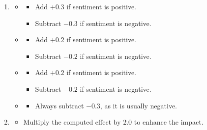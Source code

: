 \documentclass[3p,times,procedia]{elsarticle}
\begin{document}
\begin{enumerate}
    \item {}
    \begin{itemize}
        \item {} 
        \begin{itemize}
            \item Add $+0.3$ if sentiment is positive.
            \item Subtract $-0.3$ if sentiment is negative.
        \end{itemize}
        \item {}
        \begin{itemize}
            \item Add $+0.2$ if sentiment is positive.
            \item Subtract $-0.2$ if sentiment is negative.
        \end{itemize}
        \item {}
        \begin{itemize}
            \item Add $+0.2$ if sentiment is positive.
            \item Subtract $-0.2$ if sentiment is negative.
        \end{itemize}
        \item {}
        \begin{itemize}
            \item Always subtract $-0.3$, as it is usually negative.
        \end{itemize}
    \end{itemize}

    \item {}
    \begin{itemize}
        \item Multiply the computed effect by $2.0$ to enhance the impact.
    \end{itemize}
\end{enumerate}
\end{document}
